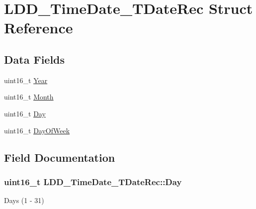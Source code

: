 \hypertarget{struct_l_d_d___time_date___t_date_rec}{}\section{L\+D\+D\+\_\+\+Time\+Date\+\_\+\+T\+Date\+Rec Struct Reference}
\label{struct_l_d_d___time_date___t_date_rec}
\subsection*{Data Fields}
\begin{DoxyCompactItemize}
\item 
uint16\+\_\+t \hyperlink{struct_l_d_d___time_date___t_date_rec_a58eee644efb4f46adc3437063c7bc194}{Year}
\item 
uint16\+\_\+t \hyperlink{struct_l_d_d___time_date___t_date_rec_a28aaeffe98b07d60db379d12269fa822}{Month}
\item 
uint16\+\_\+t \hyperlink{struct_l_d_d___time_date___t_date_rec_a6f1463c1917d6fe55a492bdb85a6bd17}{Day}
\item 
uint16\+\_\+t \hyperlink{struct_l_d_d___time_date___t_date_rec_a11ed8bc2e3fbd80252a7d4802d316f1c}{Day\+Of\+Week}
\end{DoxyCompactItemize}


\subsection{Field Documentation}
\hypertarget{struct_l_d_d___time_date___t_date_rec_a6f1463c1917d6fe55a492bdb85a6bd17}{}
\subsubsection[{Day}]{\setlength{\rightskip}{0pt plus 5cm}uint16\+\_\+t L\+D\+D\+\_\+\+Time\+Date\+\_\+\+T\+Date\+Rec\+::\+Day}\label{struct_l_d_d___time_date___t_date_rec_a6f1463c1917d6fe55a492bdb85a6bd17}
Days (1 -\/ 31) \hypertarget{struct_l_d_d___time_date___t_date_rec_a11ed8bc2e3fbd80252a7d4802d316f1c}{}
